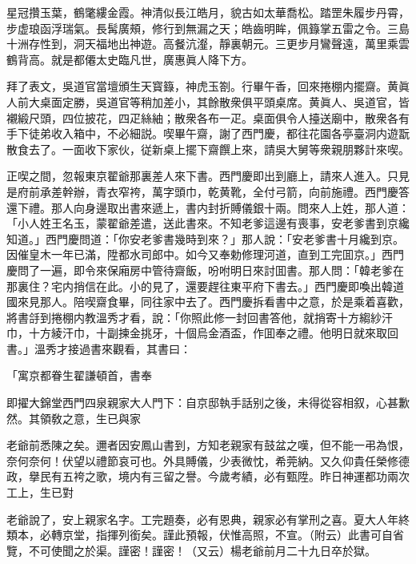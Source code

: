 \begin{myquote}
星冠攢玉葉，鶴氅縷金霞。神清似長江皓月，貌古如太華喬松。踏罡朱履步丹霄，步虚琅函浮瑞氣。長髯廣頰，修行到無漏之天；皓齒明眸，佩籙掌五雷之令。三島十洲存性到，洞天福地出神遊。高餐沆瀣，靜裏朝元。三更步月鸞聲遠，萬里乘雲鶴背高。就是都僊太史臨凡世，廣惠眞人降下方。
\end{myquote}

拜了表文，吳道官當壇頒生天寳籙，神虎玉劄。行畢午香，回來捲棚内擺齋。黄眞人前大桌面定勝，吳道官等稍加差小，其餘散衆俱平頭桌席。黄眞人、吳道官，皆襯緞尺頭，四位披花，四疋絲紬；散衆各布一疋。桌面俱令人擡送廟中，散衆各有手下徒弟收入箱中，不必細説。喫畢午齋，謝了西門慶，都往花園各亭臺洞内遊翫散食去了。一面收下家伙，従新桌上擺下齋饌上來，請吳大舅等衆親朋夥計來喫。

正喫之間，忽報東京翟爺那裏差人來下書。西門慶即出到廳上，請來人進入。只見是府前承差幹辦，青衣窄袴，萬字頭巾，乾黄靴，全付弓箭，向前施禮。西門慶答還下禮。那人向身邊取出書來遞上，書内封折賻儀銀十兩。問來人上姓，那人道：「小人姓王名玉，蒙翟爺差遣，送此書來。不知老爹這邊有喪事，安老爹書到京纔知道。」西門慶問道：「你安老爹書幾時到來？」那人說：「安老爹書十月纔到京。因催皇木一年已滿，陞都水司郎中。如今又奉勅修理河道，直到工完囬京。」西門慶問了一遍，即令來保廂房中管待齋飯，吩咐明日來討囬書。那人問：「韓老爹在那裏住？宅内捎信在此。小的見了，還要趕往東平府下書去。」西門慶即喚出韓道國來見那人。陪喫齋食畢，同往家中去了。西門慶拆看書中之意，於是乘着喜歡，將書㧱到捲棚内教溫秀才看，說：「你照此修一封回書答他，就捎寄十方縐紗汗巾，十方綾汗巾，十副揀金挑牙，十個烏金酒盃，作囬奉之禮。他明日就來取回書。」溫秀才接過書來觀看，其書曰：

\begin{myquote}[\markfont]
\hspace*{4em}「寓京都眷生翟謙頓首，書奉

即擢大錦堂西門四泉親家大人門下：自京邸執手話别之後，未得從容相叙，心甚歉然。其領敎之意，生已與家

老爺前悉陳之矣。邇者因安鳳山書到，方知老親家有鼓盆之嘆，但不能一弔為恨，奈何奈何！伏望以禮節哀可也。外具賻儀，少表微忱，希莞納。又久仰貴任榮修德政，擧民有五袴之歌，境内有三留之譽。今歲考績，必有甄陞。昨日神運都功兩次工上，生已對

老爺說了，安上親家名字。工完題奏，必有恩典，親家必有掌刑之喜。夏大人年終類本，必轉京堂，指揮列銜矣。謹此預報，伏惟高照，不宣。{\kaishu（附云）}此書可自省覽，不可使聞之於渠。謹密！謹密！{\kaishu（又云）}楊老爺前月二十九日卒於獄。

\end{myquote}

